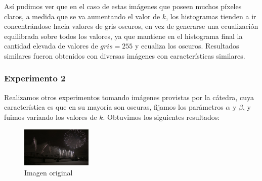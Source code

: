 \documentclass[10pt, a4paper]{article}
\begin{document}
Así pudimos ver que en el caso de estas imágenes que poseen muchos píxeles claros, a medida que se va aumentando el valor de $k$, los histogramas tienden a ir concentrándose hacia valores de gris oscuros, en vez de generarse una ecualización equilibrada sobre todos los valores, ya que mantiene en el histograma final la cantidad elevada de valores de $gris=255$ y ecualiza los oscuros. Resultados similares fueron obtenidos con diversas imágenes con características similares. 

\subsubsection{Experimento 2}

Realizamos otros experimentos tomando imágenes provistas por la cátedra, cuya característica es que en su mayoría son oscuras, fijamos los parámetros $\alpha$ y $\beta$, y fuimos variando los valores de $k$. Obtuvimos los siguientes resultados:

\begin{figure}[H]
	\centering
        \includegraphics[width=0.3\textwidth]{fireworks.jpg}
        \caption{Imagen original}
\end{figure}
\end{document}
